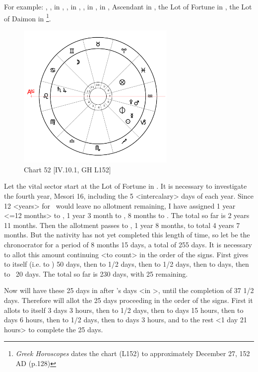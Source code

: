 For example: \Sun, \Mercury, in \Capricorn, \Saturn, \Jupiter\xspace in \Leo, \Mars, \Venus\xspace in \Aquarius, \Moon\xspace in \Gemini, Ascendant in \Leo, the Lot of Fortune in \Pisces, the Lot of Daimon in \Capricorn
\footnote{\textit{Greek Horoscopes} dates the chart (L152) to approximately December 27, 152 AD (p.128)}. 

\clearpage
\begin{figure}
\centering
\vspace{-20pt}
\includegraphics[width=0.68\textwidth]{charts/4_10_1}
\caption{Chart 52 [IV.10.1, GH L152]}
\label{fig:chart52}
\end{figure} 

Let the vital sector start at the Lot of Fortune in \Pisces. It is necessary to investigate the fourth year, Mesori 16,
including the 5 <intercalary> days of each year. Since 12 <years> for \Pisces\, would leave no allotment remaining, I have assigned 1 year <=12 months> to \Pisces, 1 year 3 month to \Aries, 8 months to \Taurus. The total so far is 2 years 11 months. Then the allotment passes to \Mercury, 1 year 8 months, to total 4 years 7 months. But the nativity has not yet completed this length of time, so let \Mercury\xspace be the chronocrator for a period of 8 months 15 days, a total of 255 days. It is necessary to allot this amount continuing <to count> in the order of the signs. First \Mercury\xspace gives to itself (i.e. to \Gemini) 50 days, then to \Cancer\xspace 62 1/2 days, then to \Leo\xspace 47 1/2 days, then to \Virgo\xspace 50 days, then to \Libra\,  20 days. The total so far is 230 days, with 25 remaining. 

Now \Mars will have these 25 days in \Scorpio\xspace after \Venus's days <in \Libra>, until the completion of 37 1/2 days. Therefore \Mars\xspace will allot the 25 days proceeding in the order of the signs. First it allots to itself 3 days 3 hours, then to \Sagittarius\xspace 2 1/2 days, then to
\Capricorn\xspace 5 days 15 hours, then to \Aquarius\xspace 6 days 6 hours, then to \Pisces\xspace 2 1/2 days, then to \Aries\xspace 3 days 3 hours, and to \Taurus\xspace the rest <1 day 21 hours> to complete the 25 days. 

